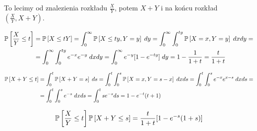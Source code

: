 \documentclass{article}
\begin{document}
To lecimy od znalezienia rozkładu $\frac{X}{Y}$, potem $X+Y$ i na końcu rozkład $(\frac{X}{Y}, X+Y)$.

\begin{align*}
    \prob{\frac{X}{Y}\leq t}&=\prob{X\leq tY}=\int_0^\infty\prob{X\leq ty, Y=y}\;dy=\int_0^\infty\int_0^{ty}\prob{X=x, Y=y}\;dxdy=\\
    &=\int_0^\infty\int_0^{ty}e^{-x}e^{-y}\;dxdy=\int_0^\infty e^{-y}[1-e^{-ty}]\;dy=1-\frac{1}{1+t}=\frac{t}{1+t}
\end{align*}



\begin{align*}
    \prob{X+Y\leq t}&=\int_0^t\prob{X+Y=s}\;ds=\int_0^t\int_0^s\prob{X=x, Y=s-x}\;dxds=\int_0^t\int_0^se^{-x}e^{x-s}\;dxds=\\
    &=\int_0^t\int_0^se^{-s}\;dxds=\int_0^tse^{-s}ds=1-e^{-t}(t+1)
\end{align*}


$$\prob{\frac{X}{Y}\leq t}\prob{X+Y\leq s}=\frac{t}{1+t}[1-e^{-s}(1+s)]$$

\end{document}
